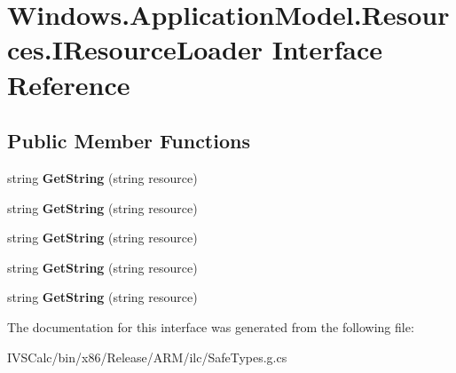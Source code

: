 \hypertarget{interface_windows_1_1_application_model_1_1_resources_1_1_i_resource_loader}{}\section{Windows.\+Application\+Model.\+Resources.\+I\+Resource\+Loader Interface Reference}
\label{interface_windows_1_1_application_model_1_1_resources_1_1_i_resource_loader}
\subsection*{Public Member Functions}
\begin{DoxyCompactItemize}
\item 
\mbox{\label{interface_windows_1_1_application_model_1_1_resources_1_1_i_resource_loader_a83367adcc86391eeaa7d49aa657193e5}} 
string {\bfseries Get\+String} (string resource)
\item 
\mbox{\label{interface_windows_1_1_application_model_1_1_resources_1_1_i_resource_loader_a83367adcc86391eeaa7d49aa657193e5}} 
string {\bfseries Get\+String} (string resource)
\item 
\mbox{\label{interface_windows_1_1_application_model_1_1_resources_1_1_i_resource_loader_a83367adcc86391eeaa7d49aa657193e5}} 
string {\bfseries Get\+String} (string resource)
\item 
\mbox{\label{interface_windows_1_1_application_model_1_1_resources_1_1_i_resource_loader_a83367adcc86391eeaa7d49aa657193e5}} 
string {\bfseries Get\+String} (string resource)
\item 
\mbox{\label{interface_windows_1_1_application_model_1_1_resources_1_1_i_resource_loader_a83367adcc86391eeaa7d49aa657193e5}} 
string {\bfseries Get\+String} (string resource)
\end{DoxyCompactItemize}


The documentation for this interface was generated from the following file\+:\begin{DoxyCompactItemize}
\item 
I\+V\+S\+Calc/bin/x86/\+Release/\+A\+R\+M/ilc/Safe\+Types.\+g.\+cs\end{DoxyCompactItemize}
